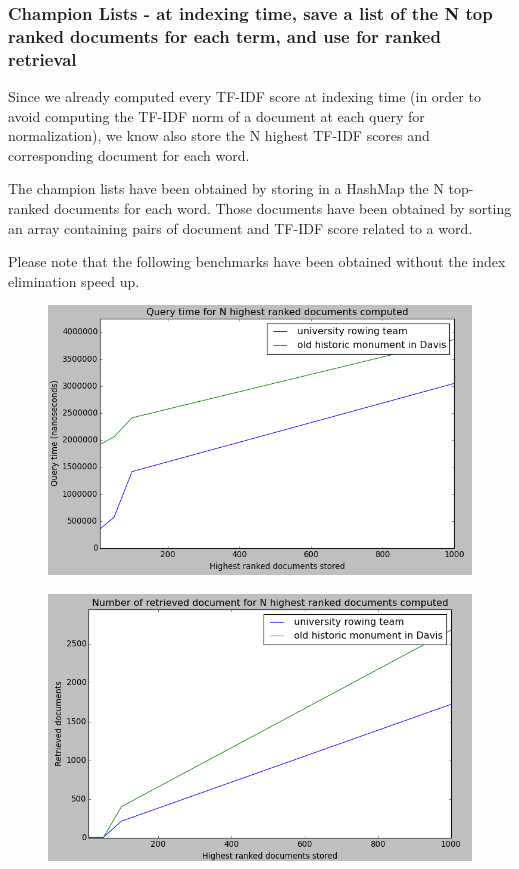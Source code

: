 \subsubsection{Champion Lists - at indexing time, save a list of the N top ranked documents for each term, and use for ranked retrieval}
Since we already computed every TF-IDF score at indexing time (in order to avoid computing the TF-IDF norm of a document at each query for normalization), we know also store the N highest TF-IDF scores and corresponding document for each word.

The champion lists have been obtained by storing in a HashMap the N top-ranked documents for each word. Those documents have been obtained by sorting an array containing pairs of document and TF-IDF score related to a word.

Please note that the following benchmarks have been obtained without the index elimination speed up.

\begin{figure}[H]
\centering
\includegraphics[width=0.7\linewidth]{img/champion_lists_speedup.png}
\end{figure}

\begin{figure}[H]
\centering 
\includegraphics[width=0.7\linewidth]{img/champion_lists_results.png}
\end{figure}


